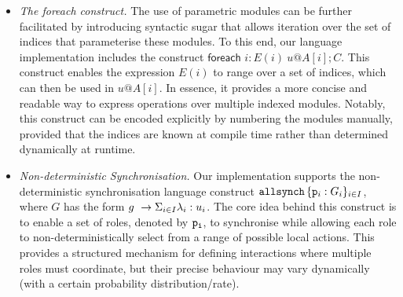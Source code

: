 \begin{itemize}
\item {\em The {\sf foreach} construct.} The use of parametric modules
  can be further facilitated by introducing syntactic sugar that
  allows iteration over the set of indices that parameterise these
  modules. To this end, our language implementation includes the
  construct $\textsf{foreach } i:E(i)\ u@A[i]; C$.  This
  construct enables the expression $E(i)$ to range over a set of
  indices, which can then be used in $u@A[i]$. In essence, it provides
  a more concise and readable way to express operations over multiple
  indexed modules. Notably, this construct can be encoded explicitly
  by numbering the modules manually, provided that the indices are
  known at compile time rather than determined dynamically at runtime.

\item {\em Non-deterministic Synchronisation.}  Our implementation
  supports the non-deterministic synchronisation language construct
  $\mathtt{allsynch}\, \{ {\mathtt{p}}_{i}:G_{i}\}_{i\in I}$, where $G$ has the form $g\ \rightarrow \Sigma_{i\in I}\lambda_i: u_i$. The core idea behind this construct is to enable a set of roles,
  denoted by $\mathtt{p_i}$, to synchronise while allowing each role to
  non-deterministically select from a range of possible local
  actions. This provides a structured mechanism for defining
  interactions where multiple roles must coordinate, but their precise
  behaviour may vary dynamically (with a certain probability
  distribution/rate).


\end{itemize}
